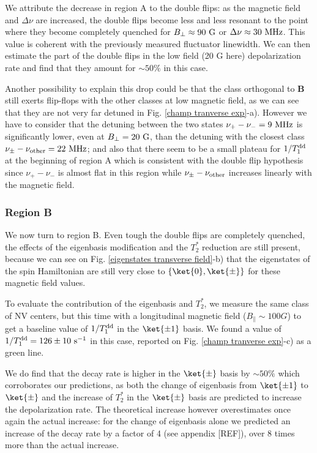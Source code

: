 \documentclass[a4paper,11pt]{report}
\begin{document}
We attribute the decrease in region A to the double flips: as the magnetic field and $\Delta \nu$ are increased, the double flips become less and less resonant to the point where they become completely quenched for $B_\perp \approx 90\ \rm G$ or $\Delta \nu \approx 30\ \rm MHz$. This value is coherent with the previously measured fluctuator linewidth. We can then estimate the part of the double flips in the low field (20 G here) depolarization rate and find that they amount for $\sim 50\%$ in this case.

Another possibility to explain this drop could be that the class orthogonal to $\mathbf{B}$ still exerts flip-flops with the other classes at low magnetic field, as we can see that they are not very far detuned in Fig. \ref{champ tranverse exp}-a). However we have to consider that the detuning between the two states $\nu_+-\nu_-= 9\ \rm MHz$ is significantly lower, even at $B_\perp=20\ \rm G$, than the detuning with the closest class $\nu_\pm-\nu_{\rm other}= 22\ \rm MHz$; and also that there seem to be a small plateau for $1/T_1^{\rm dd}$ at the beginning of region A which is consistent with the double flip hypothesis since  $\nu_+-\nu_-$ is almost flat in this region while $\nu_\pm-\nu_{\rm other}$ increases linearly with the magnetic field.

\subsubsection{Region B}

We now turn to region B. Even tough the double flips are completely quenched, the effects of the eigenbasis modification and the $T_2^*$ reduction are still present, because we can see on Fig. \ref{eigenstates transverse field}-b) that the eigenstates of the spin Hamiltonian are still very close to $\{ \ket{0}, \ket{\pm} \}$ for these magnetic field values.

To evaluate the contribution of the eigenbasis and $T_2^*$, we measure the same class of NV centers, but this time with a longitudinal magnetic field ($B_\parallel \sim 100 G$) to get a baseline value of $1/T_1^{\rm dd}$ in the $\ket{\pm 1}$ basis. We found a value of $1/T_1^{\rm dd}=126 \pm 10\ \rm s^{-1}$ in this case, reported on Fig. \ref{champ tranverse exp}-c) as a green line. 

We do find that the decay rate is higher in the $\ket{\pm}$ basis by $\sim 50\% $ which corroborates our predictions, as both the change of eigenbasis from $\ket{\pm 1}$ to $\ket{\pm}$ and the increase of $T_2^*$ in the $\ket{\pm}$ basis are predicted to increase the depolarization rate. The theoretical increase however overestimates once again the actual increase: for the change of eigenbasis alone we predicted an increase of the decay rate by a factor of 4 (see appendix [REF]), over 8 times more than the actual increase.
\end{document}
